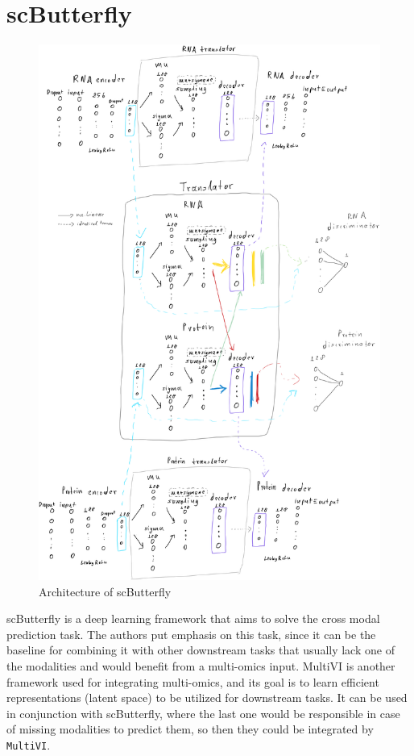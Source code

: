 \documentclass[12pt, a4paper]{article}
\begin{document}
\section{scButterfly}

\begin{figure}[h!]
  \centering
  \includegraphics[width=.8\textwidth]{sc_butterfly.PNG}
  \caption{Architecture of scButterfly}
  \label{fig:sc_butterfly}
\end{figure}

scButterfly \cite{caoScButterflyVersatileSinglecell2024} is a deep learning framework that aims to solve the cross modal prediction task. The authors put emphasis on this task, since it can be the baseline for combining it with other downstream tasks that usually lack one of the modalities and would benefit from a multi-omics input. MultiVI \cite{ashuachMultiVIDeepGenerative2023} is another framework used for integrating multi-omics, and its goal is to learn efficient representations (latent space) to be utilized for downstream tasks. It can be used in conjunction with scButterfly, where the last one would be responsible in case of missing modalities to predict them, so then they could be integrated by \verb|MultiVI|. 
\end{document}
